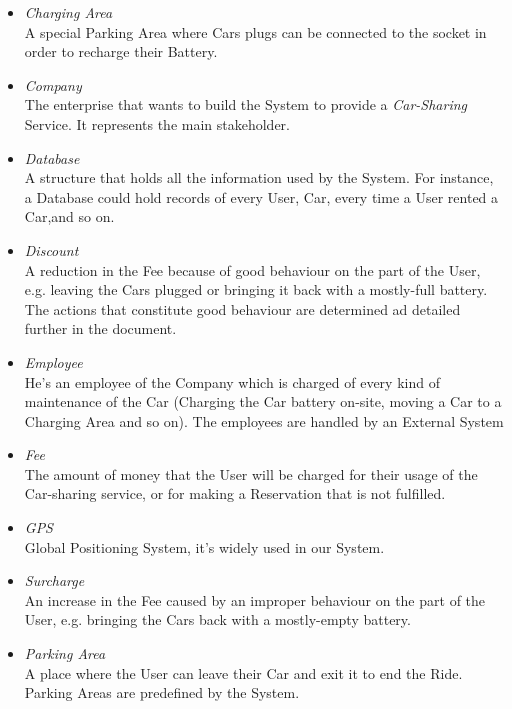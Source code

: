 \begin{itemize}
	\item \emph{Charging Area} \\		
	A special Parking Area where Cars plugs can be connected to the socket in order to recharge their Battery.	

	\item \emph{Company} \\
	The enterprise that wants to build the System to provide a \textit{Car-Sharing} Service. It represents the main stakeholder.	
	
	\item \emph{Database} \\
	A structure that holds all the information used by the System. For instance, a Database could hold records of every User, Car, every time a User rented a Car,and so on.

	\item \emph{Discount} \\
	A reduction in the Fee because of good behaviour on the part of the User, e.g. leaving the Cars plugged or bringing it back with a mostly-full battery. The actions that constitute good behaviour are determined ad detailed further in the document.

	\item \emph{Employee}\\
	He's an employee of the Company which is charged of every kind of maintenance of the Car (Charging the Car battery on-site, moving a Car to a Charging Area and so on). The employees are handled by an External System

	\item \emph{Fee}\\
	The amount of money that the User will be charged for their usage of the Car-sharing service, or for making a Reservation that is not fulfilled.

	\item \emph{GPS}\\
	Global Positioning System, it's widely used in our System.

	\item \emph{Surcharge}\\
	An increase in the Fee caused by an improper behaviour on the part of the User, e.g. bringing the Cars back with a mostly-empty battery.

	\item \emph{Parking Area}\\
	A place where the User can leave their Car and exit it to end the Ride. Parking Areas are predefined by the System.


\end{itemize}
